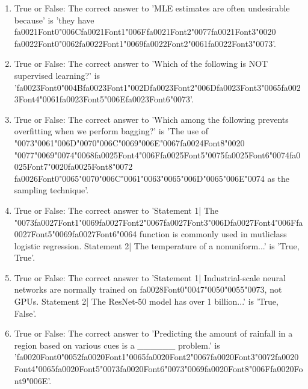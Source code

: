 \documentclass[12pt]{article}
\begin{document}
\begin{enumerate}[label=\arabic*.]
\item True or False: The correct answer to 'MLE estimates are often undesirable because' is 'they have {\csname fa0021Font0\endcsname\char"006C}{\csname fa0021Font1\endcsname\char"006F}{\csname fa0021Font2\endcsname\char"0077}{\csname fa0021Font3\endcsname\char"0020} {\csname fa0022Font0\endcsname\char"0062}{\csname fa0022Font1\endcsname\char"0069}{\csname fa0022Font2\endcsname\char"0061}{\csname fa0022Font3\endcsname\char"0073}'.
\item True or False: The correct answer to 'Which of the following is NOT supervised learning?' is '{\csname fa0023Font0\endcsname\char"004B}{\csname fa0023Font1\endcsname\char"002D}{\csname fa0023Font2\endcsname\char"006D}{\csname fa0023Font3\endcsname\char"0065}{\csname fa0023Font4\endcsname\char"0061}{\csname fa0023Font5\endcsname\char"006E}{\csname fa0023Font6\endcsname\char"0073}'.
\item True or False: The correct answer to 'Which among the following prevents overfitting when we perform bagging?' is 'The use of {\char"0073}{\char"0061}{\char"006D}{\char"0070}{\char"006C}{\char"0069}{\char"006E}{\char"0067}{\csname fa0024Font8\endcsname\char"0020} {\char"0077}{\char"0069}{\char"0074}{\char"0068}{\csname fa0025Font4\endcsname\char"006F}{\csname fa0025Font5\endcsname\char"0075}{\csname fa0025Font6\endcsname\char"0074}{\csname fa0025Font7\endcsname\char"0020}{\csname fa0025Font8\endcsname\char"0072} {\csname fa0026Font0\endcsname\char"0065}{\char"0070}{\char"006C}{\char"0061}{\char"0063}{\char"0065}{\char"006D}{\char"0065}{\char"006E}{\char"0074} as the sampling technique'.
\item True or False: The correct answer to 'Statement 1| The {\char"0073}{\csname fa0027Font1\endcsname\char"0069}{\csname fa0027Font2\endcsname\char"0067}{\csname fa0027Font3\endcsname\char"006D}{\csname fa0027Font4\endcsname\char"006F}{\csname fa0027Font5\endcsname\char"0069}{\csname fa0027Font6\endcsname\char"0064} function is commonly used in mutliclass logistic regression. Statement 2| The temperature of a nonuniform...' is 'True, True'.
\item True or False: The correct answer to 'Statement 1| Industrial-scale neural networks are normally trained on {\csname fa0028Font0\endcsname\char"0047}{\char"0050}{\char"0055}{\char"0073}, not GPUs. Statement 2| The ResNet-50 model has over 1 billion...' is 'True, False'.
\item True or False: The correct answer to 'Predicting the amount of rainfall in a region based on various cues is a \_\_\_\_\_\_ problem.' is '{\csname fa0020Font0\endcsname\char"0052}{\csname fa0020Font1\endcsname\char"0065}{\csname fa0020Font2\endcsname\char"0067}{\csname fa0020Font3\endcsname\char"0072}{\csname fa0020Font4\endcsname\char"0065}{\csname fa0020Font5\endcsname\char"0073}{\csname fa0020Font6\endcsname\char"0073}{\char"0069}{\csname fa0020Font8\endcsname\char"006F}{\csname fa0020Font9\endcsname\char"006E}'.

\end{enumerate}
\end{document}
